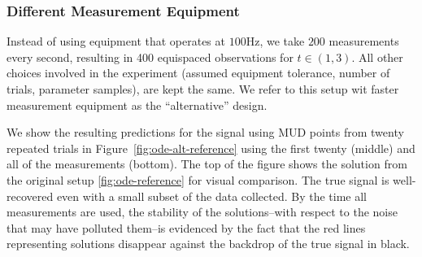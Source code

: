 \subsubsection{Different Measurement Equipment}
Instead of using equipment that operates at $100$Hz, we take $200$ measurements every second, resulting in 400 equispaced observations for $t \in (1,3)$.
All other choices involved in the experiment (assumed equipment tolerance, number of trials, parameter samples), are kept the same.
We refer to this setup wit faster measurement equipment as the ``alternative'' design.


We show the resulting predictions for the signal using MUD points from twenty repeated trials in Figure~\ref{fig:ode-alt-reference} using the first twenty (middle) and all of the measurements (bottom).
The top of the figure shows the solution from the original setup \ref{fig:ode-reference} for visual comparison.
The true signal is well-recovered even with a small subset of the data collected.
By the time all measurements are used, the stability of the solutions\---with respect to the noise that may have polluted them\---is evidenced by the fact that the red lines representing solutions disappear against the backdrop of the true signal in black.

